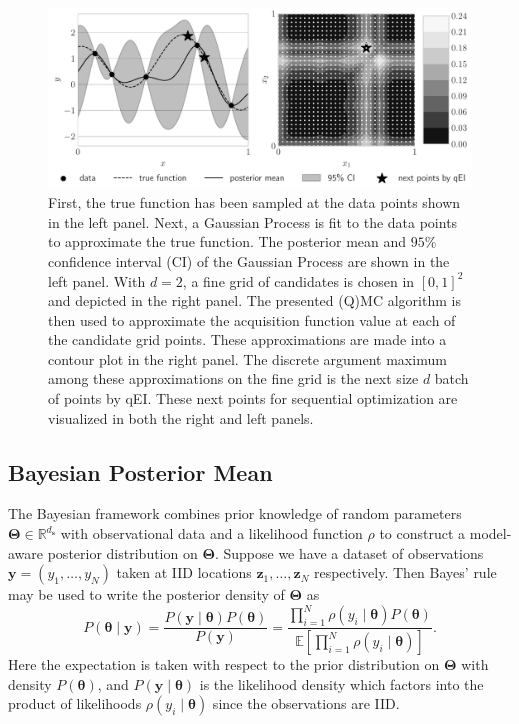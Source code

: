 \documentclass[graybox]{svmult}
\begin{document}
\begin{figure}[t]
    \centering
    \includegraphics[width=.9\textwidth]{figs/gp.pdf}
    \caption{First, the true function has been sampled at the data points shown in the left panel. Next, a Gaussian Process is fit to the data points to approximate the true function. The posterior mean and $95\%$ confidence interval (CI) of the Gaussian Process are shown in the left panel. With $d=2$, a fine grid of candidates is chosen in $[0,1]^{2}$ and depicted in the right panel. The presented (Q)MC algorithm is then used to approximate the acquisition function value at each of the candidate grid points. These approximations are made into a contour plot in the right panel. The discrete argument maximum among these approximations on the fine grid is the next size $d$ batch of points by qEI. These next points for sequential optimization are visualized in both the right and left panels.}
    \label{SoRa_fig:bo_qei}
\end{figure}

\subsection{Bayesian Posterior Mean}

The Bayesian framework combines prior knowledge of random parameters $\boldsymbol{\Theta} \in \mathbb{R}^{d_{\boldsymbol{s}}}$ with observational data and a likelihood function $\rho$ to construct a model-aware posterior distribution on $\boldsymbol{\Theta}$. Suppose we have a dataset of observations $\boldsymbol{y} = (y_1,\dots,y_{N})$ taken at IID locations $\boldsymbol{z}_1,\dots,\boldsymbol{z}_{N}$ respectively. Then Bayes' rule may be used to write the posterior density of $\boldsymbol{\Theta}$ as 
$$P\left(\boldsymbol{\theta} \mid \boldsymbol{y} \right) = \frac{P(\boldsymbol{y} \mid \boldsymbol{\theta}) P(\boldsymbol{\theta})}{P\left(\boldsymbol{y}\right)} = \frac{\prod_{i=1}^{N} \rho(y_i \mid \boldsymbol{\theta}) P(\boldsymbol{\theta})}{\mathbb{E}\left[\prod_{i=1}^{N} \rho(y_i \mid \boldsymbol{\theta})\right]}.$$
Here the expectation is taken with respect to the prior distribution on $\boldsymbol{\Theta}$ with density $P(\boldsymbol{\theta})$, and $P\left(\boldsymbol{y} \mid \boldsymbol{\theta} \right)$ is the likelihood density which factors into the product of likelihoods $\rho(y_i \mid \boldsymbol{\theta})$ since the observations are IID. 
\end{document}
